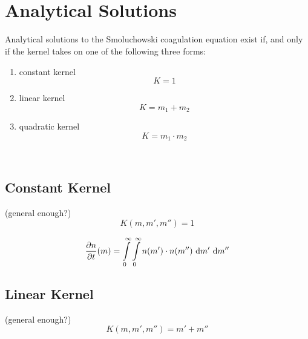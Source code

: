      \\
     \\

\newpage\section{Analytical Solutions}

    Analytical solutions to the Smoluchowski coagulation equation exist if, and only if the kernel
    takes on one of the following three forms:
    \begin{enumerate}
        \item constant kernel
            $$K=1$$
        \item linear kernel
            $$K=m_1+m_2$$
        \item quadratic kernel
            $$K=m_1\cdot m_2$$
    \end{enumerate}
     \\

    \subsection{Constant Kernel}

     (general enough?)
    \begin{equation}
        K(m, m', m'')
            = 1
    \end{equation}

    \begin{equation}
        \frac{\partial n}{\partial t}(m)
            = 
                \int\limits_0^\infty \int\limits_0^\infty
                n(m') \cdot n(m'')
                \ \text{d} m' \ \text{d} m''
    \end{equation}

    \subsection{Linear Kernel}

     (general enough?)
    \begin{equation}
        K(m, m', m'')
            = m' + m''
    \end{equation}

